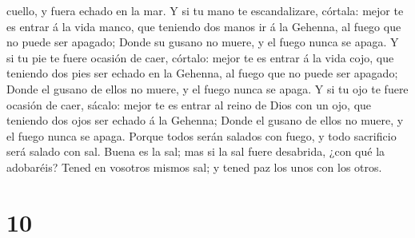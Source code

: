 cuello, y fuera echado en la mar.  Y si tu mano te
escandalizare, córtala: mejor te es entrar á la vida manco, que teniendo
dos manos ir á la Gehenna, al fuego que no puede ser apagado;
 Donde su gusano no muere, y el fuego nunca se apaga.
 Y si tu pie te fuere ocasión de caer, córtalo: mejor te
es entrar á la vida cojo, que teniendo dos pies ser echado en la
Gehenna, al fuego que no puede ser apagado;  Donde el
gusano de ellos no muere, y el fuego nunca se apaga.  Y
si tu ojo te fuere ocasión de caer, sácalo: mejor te es entrar al reino
de Dios con un ojo, que teniendo dos ojos ser echado á la Gehenna;
 Donde el gusano de ellos no muere, y el fuego nunca se
apaga.  Porque todos serán salados con fuego, y todo
sacrificio será salado con sal.  Buena es la sal; mas si
la sal fuere desabrida, ¿con qué la adobaréis? Tened en vosotros mismos
sal; y tened paz los unos con los otros.

\hypertarget{section-9}{%
\section{10}\label{section-9}}

